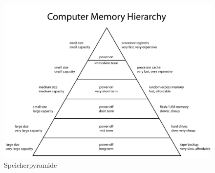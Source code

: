                 \begin{figure}[H]
                    \centering
                    \includegraphics[scale=0.2]{img/speicherpyramide.png}
                    \caption[Speicherpyramide]{Speicherpyramide \cite{memory-hierarchy}}
                    \label{fig:memory-hierarchy}
                \end{figure}






                
            
                
            
           
            
            

            

            



            
    
        

    
